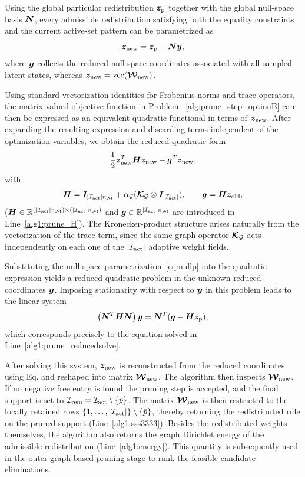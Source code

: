 \documentclass[11pt,a4paper]{article}
\begin{document}
Using the global particular redistribution \(\bm{z}_{\mathrm{p}}\) together with the
global null-space basis \(\bm{N}\), every admissible redistribution
satisfying both the equality constraints and the current active-set
pattern can be parametrized as
\begin{equation}
\label{eq:nullp}
\bm{z}_{\mathrm{new}}
=
\bm{z}_{\mathrm{p}}+\bm{N}\bm{y},
\end{equation}
where \(\bm{y}\) collects the reduced null-space coordinates associated
with all sampled latent states, whereas $\bm{z}_{\mathrm{new}}=\operatorname{vec}(\boldsymbol{\mathcal{W}}_{\mathrm{new}})$.


 Using standard
vectorization identities for Frobenius norms and trace operators, the
matrix-valued objective function in Problem  ~\ref{alg:prune_step_optionB} can then be expressed as an equivalent quadratic
functional in terms of \(\bm{z}_{\mathrm{new}}\). After expanding the resulting
expression and discarding terms independent of the optimization
variables, we obtain the reduced quadratic form
\begin{equation}
\label{eq:quadar}
\frac12\bm{z}_{\mathrm{new}}^T\bm{H}\bm{z}_{\mathrm{new}}-\bm{g}^T\bm{z}_{\mathrm{new}}.
\end{equation}
with
\begin{equation}
 \label{eq:Hoperator}
\bm{H}
=
\bm{I}_{|\mathcal{I}_{\mathrm{act}}|n_{\mathcal{M}}}
+
\alpha_{\mathcal{G}}
(\boldsymbol{\mathcal{K}}_{\mathcal{G}}\otimes\bm{I}_{|\mathcal{I}_{\mathrm{act}}|}),
\qquad
\bm{g}
=
\bm{H}\bm{z}_{\mathrm{old}},
\end{equation}
(\(\bm{H}\in\mathbb{R}^{(|\mathcal{I}_{\mathrm{act}}|n_{\mathcal{M}})\times(|\mathcal{I}_{\mathrm{act}}|n_{\mathcal{M}})}\) and
\(\bm{g}\in\mathbb{R}^{|\mathcal{I}_{\mathrm{act}}|n_{\mathcal{M}}}\) are introduced in
Line~\ref{alg1:prune_H}). The Kronecker-product
structure arises naturally from the vectorization of the trace term,
since the same graph operator \(\boldsymbol{\mathcal{K}}_{\mathcal{G}}\) acts independently on each one
of the \( |\mathcal{I}_{\mathrm{act}}| \) adaptive weight fields.

Substituting the null-space parametrization~\ref{eq:nullp} into the quadratic expression  yields a reduced quadratic problem in the
unknown reduced coordinates \(\bm{y}\). Imposing stationarity with
respect to \(\bm{y}\) in this problem  leads to the linear system
\begin{equation}
\label{eq:solveY}
\left(\bm{N}^T\bm{H}\bm{N}\right)\bm{y}
=
\bm{N}^T(\bm{g}-\bm{H}\bm{z}_{\mathrm{p}}),
\end{equation}
which corresponds precisely to the equation solved in
Line~\ref{alg1:prune_reducedsolve}.


After solving this system,   \(\bm{z}_{\mathrm{new}}\) is reconstructed from
the reduced coordinates using Eq.  and reshaped into   matrix \(\boldsymbol{\mathcal{W}}_{\mathrm{new}}\). The
algorithm then inspects  \(\boldsymbol{\mathcal{W}}_{\mathrm{new}}\).  If
no negative free entry is found the pruning step is accepted, and the final support is set to
\(\mathcal{I}_{\mathrm{rem}}=\mathcal{I}_{\mathrm{act}}\setminus\{p\}\). The matrix \(\boldsymbol{\mathcal{W}}_{\mathrm{new}}\) is then restricted
to the locally retained rows
\(\{1,\ldots,|\mathcal{I}_{\mathrm{act}}|\}\setminus\{\bar{p}\}\), thereby returning the
redistributed rule on the pruned support
(Line~\ref{alg1:sss3333}).  Besides the redistributed weights themselves, the algorithm also returns the graph Dirichlet
energy of the admissible redistribution
(Line~\ref{alg1:energy}). This quantity is subsequently used in the
outer graph-based pruning stage to rank the feasible candidate
eliminations.
\end{document}
